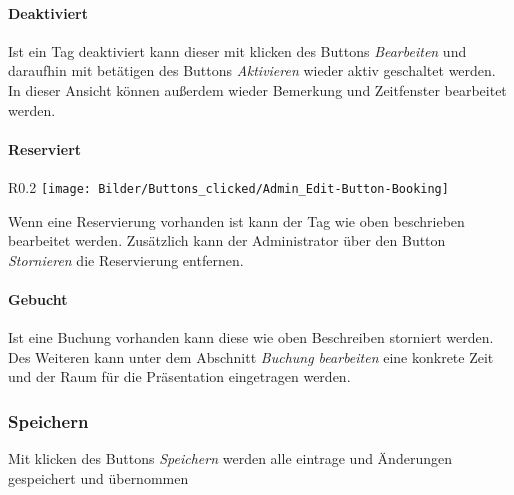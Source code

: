 \paragraph{Deaktiviert}
Ist ein Tag deaktiviert kann dieser mit klicken des Buttons \textit{Bearbeiten} und daraufhin mit betätigen des Buttons \textit{Aktivieren} wieder aktiv geschaltet werden.
In dieser Ansicht können außerdem wieder Bemerkung und Zeitfenster bearbeitet werden.
\\

\paragraph{Reserviert}
\begin{wrapfigure}{R}{0.2\textwidth}
	\centering
	\texttt{[image: Bilder/Buttons\_clicked/Admin\_Edit-Button-Booking]}
\end{wrapfigure}
Wenn eine Reservierung vorhanden ist kann der Tag wie oben beschrieben bearbeitet werden. Zusätzlich kann der Administrator über den Button \textit{Stornieren} die Reservierung entfernen.

\paragraph{Gebucht}
Ist eine Buchung vorhanden kann diese wie oben Beschreiben storniert werden. Des Weiteren kann unter dem Abschnitt \textit{Buchung bearbeiten} eine konkrete Zeit und der Raum für die Präsentation eingetragen werden.  

\subsubsection{Speichern}
Mit klicken des Buttons \textit{Speichern} werden alle eintrage und Änderungen gespeichert und übernommen 
